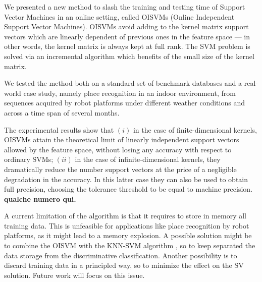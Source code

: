 We presented a new method to slash the training and testing time of
Support Vector Machines in an online setting, called OISVMs (Online
Independent Support Vector Machines). OISVMs avoid adding to the
kernel matrix support vectors which are linearly dependent of previous
ones in the feature space --- in other words, the kernel matrix is
always kept at full rank. The SVM problem is solved via an incremental
algorithm which benefits of the small size of the kernel matrix.

We tested the method both on a standard set of benchmark databases and
a real-world case study, namely place recognition in an indoor
environment, from sequences acquired by robot platforms under
different weather conditions and across a time span of several months.

The experimental results show that $(i)$ in the case of
finite-dimensional kernels, OISVMs attain the theoretical limit of
linearly independent support vectors allowed by the feature space,
without losing any accuracy with respect to ordinary SVMs; $(ii)$ in
the case of infinite-dimensional kernels, they dramatically reduce the
number support vectors at the price of a negligible degradation in the
accuracy. In this latter case they can also be used to obtain full
precision, choosing the tolerance threshold to be equal to machine
precision. {\bf qualche numero qui.}

A current limitation of the algorithm is that it requires to store in
memory all training data. This is unfeasible for applications like
place recognition by robot platforms, as it might lead to a memory
explosion. A possible solution might be to combine the OISVM with the
KNN-SVM algorithm \cite{zhang:cvpr06}, so to keep separated the data
storage from the discriminative classification. Another possibility is
to discard training data in a principled way, so to minimize the
effect on the SV solution. Future work will focus on this issue.

